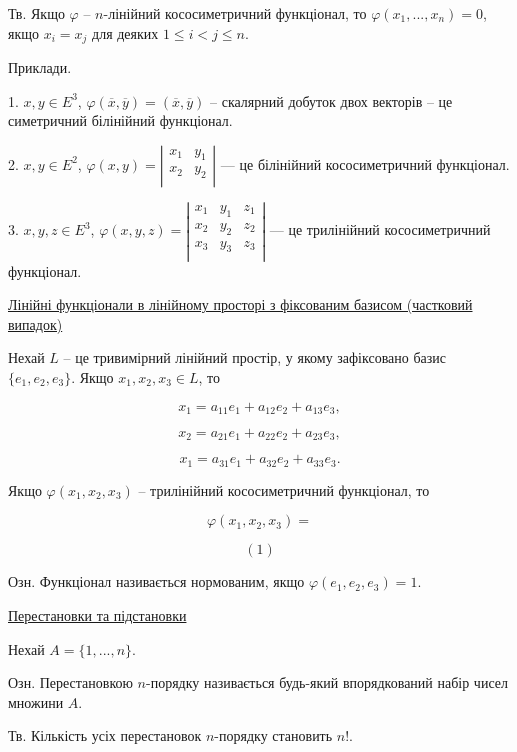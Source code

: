 Тв. Якщо $\varphi$ -- $n$-лінійний кососиметричний функціонал, то $\varphi(x_1, ..., x_n) = 0$,
якщо $x_i = x_j$ для деяких $1 \leqslant i < j \leqslant n$.


Приклади.

1. $x, y \in E^3$, $\varphi(\overline{x},\overline{y}) = (\overline{x},\overline{y})$ -- скалярний
добуток двох векторів -- це симетричний білінійний функціонал.

2. $x, y \in E^2$, $\varphi(x,y) = \left| \begin{matrix} x_1 & y_1 \\ x_2 & y_2 \\ \end{matrix} \right|$ ---
це білінійний кососиметричний функціонал.

3. $x, y, z \in E^3$,
$\varphi(x,y,z) = \left| \begin{matrix}
	x_1 & y_1 & z_1 \\
	x_2 & y_2 & z_2 \\
	x_3 & y_3 & z_3 \\
\end{matrix} \right|$
--- це трилінійний кососиметричний функціонал.


\underline{Лінійні функціонали в лінійному просторі з фіксованим базисом
(частковий випадок)}


Нехай $L$ -- це тривимірний лінійний простір, у якому зафіксовано базис
$\{e_1, e_2, e_3\}$. Якщо $x_1, x_2, x_3 \in L$, то

$$x_1 = a_{11} e_1 + a_{12} e_2 + a_{13} e_3,$$

$$x_2 = a_{21} e_1 + a_{22} e_2 + a_{23} e_3,$$

$$x_1 = a_{31} e_1 + a_{32} e_2 + a_{33} e_3.$$


Якщо $\varphi(x_1, x_2, x_3)$ -- трилінійний кососиметричний функціонал, то 

$$\varphi(x_1, x_2, x_3) = $$




$$(1)$$





Озн. Функціонал називається нормованим, якщо $\varphi(e_1, e_2, e_3) = 1$.

\underline{Перестановки та підстановки}

Нехай $A = \{1, ..., n\}$.

Озн. Перестановкою $n$-порядку називається будь-який впорядкований набір
чисел множини $A$.


Тв. Кількість усіх перестановок $n$-порядку становить $n!$.

